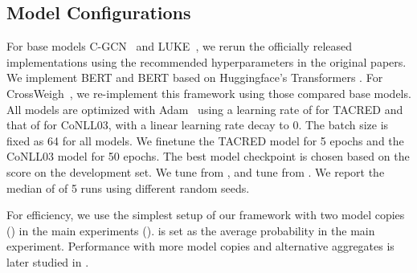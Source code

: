 \documentclass[11pt]{article}
\begin{document}
\subsection{Model Configurations}\label{sup:conf}
For base models C-GCN~\cite{Zhang2018GraphCO} and LUKE~\cite{Yamada2020LUKEDC}, we rerun the officially released implementations using the recommended hyperparameters in the original papers.
We implement BERT and BERT based on
Huggingface's Transformers \cite{wolf2020transformers}.
For CrossWeigh~\cite{Wang2019CrossWeighTN}, we re-implement this framework using those compared base models.
All models are optimized with Adam~\cite{Kingma2015AdamAM} using a learning rate of  for \mbox{TACRED} and that of   for \mbox{CoNLL03}, with a linear learning rate decay to 0.
The batch size is fixed as 64 for all models.
We finetune the TACRED model for 5 epochs and the CoNLL03 model for 50 epochs.
The best model checkpoint is chosen based on the  score on the development set.
We tune  from , and tune  from .
We report the median of  of 5 runs using different random seeds.

For efficiency, we use the simplest setup of our framework with two model copies () in the main experiments ().
 is set as the average probability in the main experiment.
Performance with more model copies and alternative aggregates is later studied in .
\end{document}
